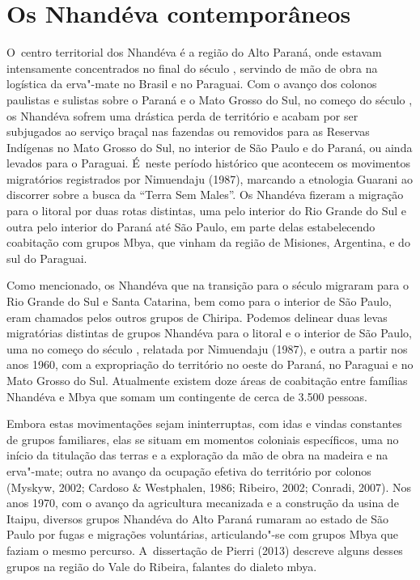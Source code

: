 \section{Os Nhandéva contemporâneos}

O~centro territorial dos Nhandéva é a região do Alto Paraná, onde
estavam intensamente concentrados no final do século , servindo de
mão de obra na logística da erva"-mate no Brasil e no Paraguai. Com o
avanço dos colonos paulistas e sulistas sobre o Paraná e o Mato Grosso
do Sul, no começo do século , os Nhandéva sofrem uma drástica perda
de território e acabam por ser subjugados ao serviço braçal nas
fazendas ou removidos para as Reservas Indígenas no Mato Grosso do Sul,
no interior de São Paulo e do Paraná, ou ainda levados para o Paraguai.
É~neste período histórico que acontecem os movimentos migratórios
registrados por Nimuendaju (1987), marcando a etnologia Guarani ao
discorrer sobre a busca da ``Terra Sem Males''. Os Nhandéva fizeram a
migração para o litoral por duas rotas distintas, uma pelo interior do
Rio Grande do Sul e outra pelo interior do Paraná até São Paulo, em
parte delas estabelecendo coabitação com grupos Mbya, que vinham da
região de Misiones, Argentina, e do sul do Paraguai.

Como mencionado, os Nhandéva que na transição para o século 
migraram para o Rio Grande do Sul e Santa Catarina, bem como para o
interior de São Paulo, eram chamados pelos outros grupos de Chiripa.
Podemos delinear duas levas migratórias distintas de grupos Nhandéva
para o litoral e o interior de São Paulo, uma no começo do século ,
relatada por Nimuendaju (1987), e outra a partir nos anos 1960, com a
expropriação do território no oeste do Paraná, no Paraguai e no Mato
Grosso do Sul. Atualmente existem doze áreas de coabitação entre
famílias Nhandéva e Mbya que somam um contingente de cerca de 3.500
pessoas.

Embora estas movimentações sejam ininterruptas, com idas e
vindas constantes de grupos familiares, elas se situam em momentos
coloniais específicos, uma no início da titulação das terras e a
exploração da mão de obra na madeira e na erva"-mate; outra no avanço da
ocupação efetiva do território por colonos (Myskyw, 2002; Cardoso \&
Westphalen, 1986; Ribeiro, 2002; Conradi, 2007). Nos anos 1970, com o
avanço da agricultura mecanizada e a construção da usina de Itaipu,
diversos grupos Nhandéva do Alto Paraná rumaram ao estado de São Paulo
por fugas e migrações voluntárias, articulando"-se com grupos Mbya que
faziam o mesmo percurso. A~dissertação de Pierri (2013) descreve
alguns desses grupos na região do Vale do Ribeira, falantes do dialeto
mbya.

